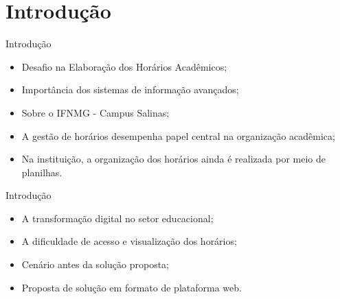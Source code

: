\section{Introdução}

\begin{frame}{Introdução}
	\begin{itemize}
		\item Desafio na Elaboração dos Horários Acadêmicos; \vspace{0.5cm}
		\item Importância dos sistemas de informação avançados; \vspace{0.5cm}
		\item Sobre o IFNMG - Campus Salinas; \vspace{0.5cm}
		\item A gestão de horários desempenha papel central na organização acadêmica; \vspace{0.5cm}
		\item Na instituição, a organização dos horários ainda é realizada por meio de planilhas. \vspace{0.5cm}
	\end{itemize}
\end{frame}

\begin{frame}{Introdução}
	\begin{itemize}
		\item A transformação digital no setor educacional; \vspace{0.5cm}
		\item A dificuldade de acesso e visualização dos horários; \vspace{0.5cm}
		\item Cenário antes da solução proposta; \vspace{0.5cm}
		\item Proposta de solução em formato de plataforma web. \vspace{0.5cm}
	\end{itemize}
\end{frame}